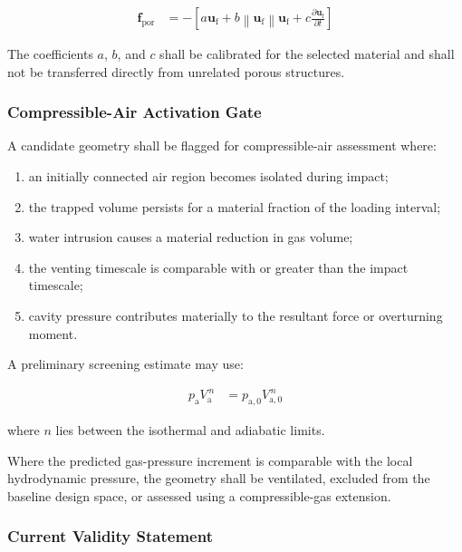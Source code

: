 \begin{align}
  \mathbf{f}_{\mathrm{por}}
  &=
  -
  \left[
    a\mathbf{u}_{\mathrm{f}}
    +
    b
    \left\lVert
    \mathbf{u}_{\mathrm{f}}
    \right\rVert
    \mathbf{u}_{\mathrm{f}}
    +
    c
    \frac{\partial\mathbf{u}_{\mathrm{f}}}{\partial t}
  \right]
  \label{eq:res-mod-asm-porous-resistance}
\end{align}

The coefficients $a$, $b$, and $c$ shall be calibrated for the
selected material and shall not be transferred directly from unrelated
porous structures.

\subsubsection{Compressible-Air Activation Gate}
\label{sec:res-mod-asm-local-compressible-air-gate}

A candidate geometry shall be flagged for compressible-air assessment
where:

\begin{enumerate}
  \item an initially connected air region becomes isolated during
    impact;
  \item the trapped volume persists for a material fraction of the
    loading interval;
  \item water intrusion causes a material reduction in gas volume;
  \item the venting timescale is comparable with or greater than the
    impact timescale;
  \item cavity pressure contributes materially to the resultant force
    or overturning moment.
\end{enumerate}

A preliminary screening estimate may use:

\begin{align}
  p_{\mathrm{a}}
  V_{\mathrm{a}}^{\,n}
  &=
  p_{\mathrm{a},0}
  V_{\mathrm{a},0}^{\,n}
  \label{eq:res-mod-asm-trapped-air-polytropic-screening}
\end{align}

where $n$ lies between the isothermal and adiabatic limits.

Where the predicted gas-pressure increment is comparable with the local
hydrodynamic pressure, the geometry shall be ventilated, excluded from
the baseline design space, or assessed using a compressible-gas
extension.

\subsubsection{Current Validity Statement}
\label{sec:res-mod-asm-local-validity-statement}

